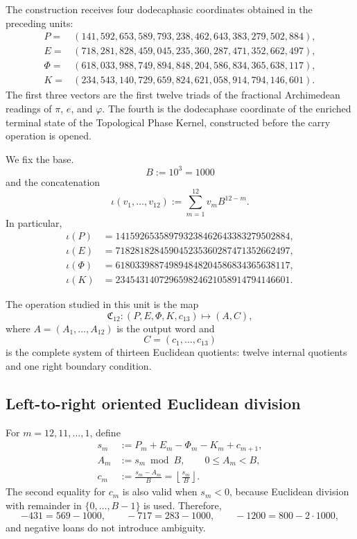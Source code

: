 The construction receives four dodecaphasic coordinates obtained in the preceding units:
\[
\begin{aligned}
 P={}&(141,592,653,589,793,238,462,643,383,279,502,884),\\
 E={}&(718,281,828,459,045,235,360,287,471,352,662,497),\\
 \Phi={}&(618,033,988,749,894,848,204,586,834,365,638,117),\\
 K={}&(234,543,140,729,659,824,621,058,914,794,146,601).
\end{aligned}
\]
The first three vectors are the first twelve triads of the fractional
Archimedean readings of \(\pi\), \(e\), and \(\varphi\). The fourth is
the dodecaphase coordinate of the enriched terminal state of the Topological
Phase Kernel, constructed before the carry operation is opened.

We fix the base.
\[
 B:=10^3=1000
\]
and the concatenation
\begin{equation}
 \iota(v_1,\ldots,v_{12})
 :=\sum_{m=1}^{12}v_mB^{12-m}.
 \label{p12-83-c10-s2:eq:concatenacion-base-mil-alpha}
\end{equation}
In particular,
\[
\begin{aligned}
 \iota(P)&=141592653589793238462643383279502884,\\
 \iota(E)&=718281828459045235360287471352662497,\\
 \iota(\Phi)&=618033988749894848204586834365638117,\\
 \iota(K)&=234543140729659824621058914794146601.
\end{aligned}
\]

The operation studied in this unit is the map
\begin{equation}
 \mathfrak C_{12}:
 (P,E,\Phi,K,c_{13})
 \longmapsto(A,C),
 \label{p12-83-c10-s2:eq:mapa-cierre-dodecafasico-alpha}
\end{equation}
where \(A=(A_1,\ldots,A_{12})\) is the output word and
\[
 C=(c_1,\ldots,c_{13})
\]
is the complete system of thirteen Euclidean quotients: twelve internal
quotients and one right boundary condition.

\subsection{Left-to-right oriented Euclidean division}

For \(m=12,11,\ldots,1\), define
\begin{equation}
\begin{aligned}
 s_m&:=P_m+E_m-\Phi_m-K_m+c_{m+1},\\
 A_m&:=s_m\bmod B,
       \qquad 0\leq A_m<B,\\
 c_m&:=\frac{s_m-A_m}{B}
      =\left\lfloor\frac{s_m}{B}\right\rfloor .
\end{aligned}
\label{p12-83-c10-s2:eq:recurrencia-corta-alpha}
\end{equation}
The second equality for \(c_m\) is also valid when \(s_m<0\),
because Euclidean division with remainder in
\(\{0,\ldots,B-1\}\) is used. Therefore,
\[
 -431=569-1000,
 \qquad
 -717=283-1000,
 \qquad
 -1200=800-2\cdot1000,
\]
and negative loans do not introduce ambiguity.

